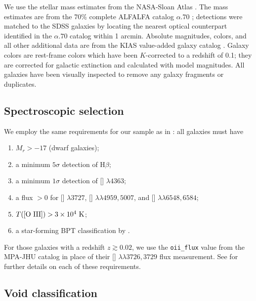 We use the stellar mass estimates from the NASA-Sloan Atlas \citep{Blanton11}.  
The  mass estimates are from the 70\% complete ALFALFA catalog 
$\alpha.70$ \citep{Giovanelli05};  detections were matched to the SDSS 
galaxies by locating the nearest optical counterpart identified in the 
$\alpha.70$ catalog within 1 arcmin.  Absolute magnitudes, colors, and all other 
additional data are from the KIAS value-added galaxy catalog 
\citep{Choi10,Blanton05}.  Galaxy colors are rest-frame colors which have been 
$K$-corrected to a redshift of 0.1; they are corrected for galactic extinction 
and calculated with model magnitudes.  All galaxies have been visually inspected 
to remove any galaxy fragments or duplicates.


\subsection{Spectroscopic selection}\label{sec:SDSS_limits_P3}

We employ the same requirements for our sample as in 
\cite{Douglass17a,Douglass17b}: all galaxies must have
\begin{enumerate}
    \item{$M_r > -17$ (dwarf galaxies);}
    \item{a minimum $5\sigma$ detection of H$\beta$;}
    \item{a minimum $1\sigma$ detection of [] $\lambda 4363$;}
    \item{a flux $> 0$ for [] $\lambda 3727$, [] $\lambda \lambda 4959,5007$, and [] $\lambda \lambda 6548,6584$;}
    \item{$T(\text{[\ion{O}{3}]}) > 3\times 10^4 \text{ K}$;}
    \item{a star-forming BPT classification by \cite{Brinchmann04}.}
\end{enumerate}

For those galaxies with a redshift $z \gtrsim 0.02$, we use the 
\texttt{oii\_flux} value from the MPA-JHU catalog in place of their [] 
$\lambda \lambda 3726,3729$ flux measurement.  See \cite{Douglass17a} for 
further details on each of these requirements.


\subsection{Void classification}

